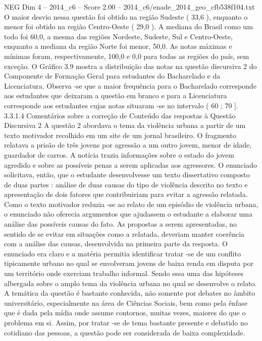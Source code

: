 \begin{textsample}{NEG Dim 4 – 2014\_c6 – Score 2.00 – 2014\_c6/enade\_2014\_geo\_cfb538f104.txt}
O maior desvio nessa questão foi obtido na região Sudeste ( 33,6 ), enquanto o menor foi obtido na região Centro-Oeste ( 29,0 ).
A mediana do Brasil como um todo foi 60,0, a mesma das regiões Nordeste, Sudeste, Sul e Centro-Oeste, enquanto a mediana da região Norte foi menor, 50,0.
As notas máximas e mínimas foram, respectivamente, 100,0 e 0,0 para todas as regiões do país, sem exceção.
O Gráfico 3.9 mostra a distribuição das notas na questão discursiva 2 do Componente de Formação Geral para estudantes do Bacharelado e da Licenciatura.
Observa -se que a maior frequência para o Bacharelado corresponde aos estudantes que deixaram a questão em branco e para a Licenciatura corresponde aos estudantes cujas notas situaram -se no intervalo ( 60 ; 70 ]. 3.3.1.4 Comentários sobre a correção de Conteúdo das respostas à Questão Discursiva 2 A questão 2 abordava o tema da violência urbana a partir de um texto motivador recolhido em um site de um jornal brasileiro.
O fragmento relatava a prisão de três jovens por agressão a um outro jovem, menor de idade, guardador de carros.
A notícia trazia informações sobre o estado do jovem agredido e sobre as possíveis penas a serem aplicadas aos agressores.
O enunciado solicitava, então, que o estudante desenvolvesse um texto dissertativo composto de duas partes : análise de duas causas do tipo de violência descrito no texto e apresentação de dois fatores que contribuiriam para evitar a agressão relatada.
Como o texto motivador reduzia -se ao relato de um episódio de violência urbana, o enunciado não oferecia argumentos que ajudassem o estudante a elaborar uma análise das possíveis causas do fato.
As propostas a serem apresentadas, no sentido de se evitar em situações como a relatada, deveriam manter coerência com a análise das causas, desenvolvida na primeira parte da resposta.
O enunciado era claro e a matéria permitia identificar tratar -se de um conflito tipicamente urbano no qual se envolveram jovens de baixa renda em disputa por um território onde exerciam trabalho informal.
Sendo essa uma das hipóteses albergada sobre o amplo tema da violência urbana no qual se desenvolve o relato.
A temática da questão é bastante conhecida, não somente por debates no âmbito universitário, especialmente na área de Ciências Sociais, bem como pela ênfase que é dada pela mídia onde assume contornos, muitas vezes, maiores do que o problema em si.
Assim, por tratar -se de tema bastante presente e debatido no cotidiano das pessoas, a questão pode ser considerada de baixa complexidade.

\end{textsample}
